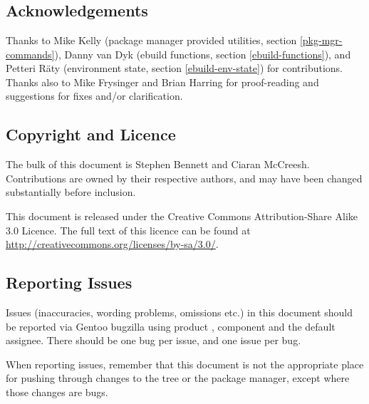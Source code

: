 \chapter*{}

\section*{Acknowledgements}

Thanks to Mike Kelly (package manager provided utilities, section \ref{pkg-mgr-commands}),
Danny van Dyk (ebuild functions, section \ref{ebuild-functions}), and
Petteri R\"aty (environment state, section \ref{ebuild-env-state}) for contributions. Thanks also to
Mike Frysinger and Brian Harring for proof-reading and suggestions for fixes and/or clarification.

\section*{Copyright and Licence}

The bulk of this document is  Stephen Bennett and Ciaran McCreesh. Contributions
are owned by their respective authors, and may have been changed substantially before inclusion.

This document is released under the Creative Commons Attribution-Share Alike 3.0 Licence. The full
text of this licence can be found at \url{http://creativecommons.org/licenses/by-sa/3.0/}.

\section*{Reporting Issues}

Issues (inaccuracies, wording problems, omissions etc.) in this document should be reported via
Gentoo bugzilla using product , component  and the default
assignee. There should be one bug per issue, and one issue per bug.

When reporting issues, remember that this document is not the appropriate place for pushing
through changes to the tree or the package manager, except where those changes are bugs.


